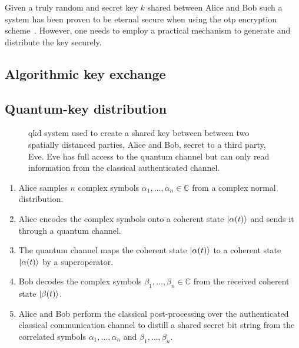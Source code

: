 Given a truly random and secret key $k$ shared between Alice and Bob such a system has been proven to be eternal secure when using the \gls{otp} encryption scheme~\cite{Shannon1949}.
However, one needs to employ a practical mechanism to generate and distribute the key securely.

\FloatBarrier
\subsection{Algorithmic key exchange}



\FloatBarrier
\subsection{Quantum-key distribution}

\begin{figure}[htb]
	\centering
	
	\caption{\Gls{qkd} system used to create a shared key between between two spatially distanced parties, Alice and Bob, secret to a third party, Eve. Eve has full access to the quantum channel but can only read information from the classical authenticated channel.}
\end{figure}



\begin{enumerate}
	\item Alice samples $n$ complex symbols $\alpha_1,\dots,\alpha_n\in\mathbb{C}$ from a complex normal distribution.
	\item Alice encodes the complex symbols onto a coherent state $\ket{\alpha(t)}$ and sends it through a quantum channel.
	\item The quantum channel maps the coherent state $\ket{\alpha(t)}$ to a coherent state $\ket{\alpha(t)}$ by a superoperator.
	\item Bob decodes the complex symbols $\beta_1,\dots,\beta_n\in\mathbb{C}$ from the received coherent state $\ket{\beta(t)}$.
	\item Alice and Bob perform the classical post-processing over the authenticated classical communication channel to distill a shared secret bit string from the correlated symbols $\alpha_1,\dots,\alpha_n$ and $\beta_1,\dots,\beta_n$.
\end{enumerate}

